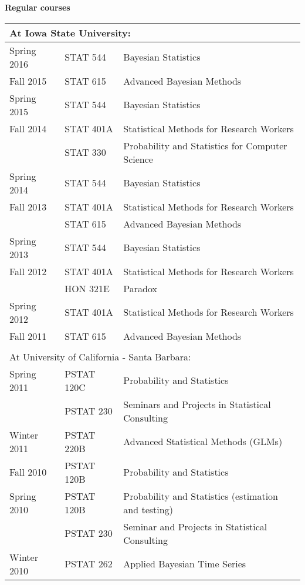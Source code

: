 \documentclass[overlapped,line]{res}
\begin{document}
\begin{resume}
{\bf Regular courses}

\begin{tabular}{lll}
\multicolumn{3}{l}{At Iowa State University:} \\
\hline
Spring 2016 & STAT 544 & Bayesian Statistics \\
Fall 2015 & STAT 615 & Advanced Bayesian Methods \\
Spring 2015 & STAT 544 & Bayesian Statistics \\
Fall 2014 & STAT 401A & Statistical Methods for Research Workers \\
& STAT 330 & Probability and Statistics for Computer Science \\
Spring 2014 & STAT 544 & Bayesian Statistics \\
Fall 2013 & STAT 401A & Statistical Methods for Research Workers \\
& STAT 615 & Advanced Bayesian Methods \\
Spring 2013 & STAT 544 & Bayesian Statistics \\
Fall 2012 & STAT 401A & Statistical Methods for Research Workers \\
 & HON 321E & Paradox \\
Spring 2012 & STAT 401A & Statistical Methods for Research Workers \\
Fall 2011 & STAT 615 & Advanced Bayesian Methods \\
\hline
\\
\multicolumn{3}{l}{At University of California - Santa Barbara:} \\
\hline
Spring 2011 & PSTAT 120C & Probability and Statistics \\ %
& PSTAT 230 & Seminars and Projects in Statistical Consulting \\
Winter 2011 & PSTAT 220B & Advanced Statistical Methods (GLMs) \\
Fall 2010  & PSTAT 120B & Probability and Statistics \\
Spring 2010 & PSTAT 120B & Probability and Statistics (estimation and testing) \\
 & PSTAT 230 & Seminar and Projects in Statistical Consulting \\
Winter 2010 & PSTAT 262 & Applied Bayesian Time Series \\
\hline
\end{tabular}

%


\end{resume}
\end{document}
